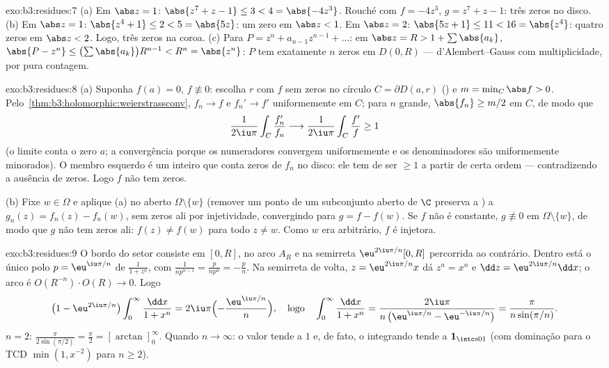 \begin{solution}{exo:b3:residues:7}
(a) Em $\abs z = 1$: $\abs{z^7 + z - 1} \leq 3 < 4 =
\abs{-4z^3}$. Rouché com $f = -4z^3$, $g = z^7 + z - 1$:
três zeros no disco.
(b) Em $\abs z = 1$: $\abs{z^4 + 1} \leq 2 < 5 = \abs{5z}$:
um zero em $\abs z < 1$. Em $\abs z = 2$: $\abs{5z + 1} \leq
11 < 16 = \abs{z^4}$: quatro zeros em $\abs z < 2$. Logo, três
zeros na coroa.
(c) Para $P = z^n + a_{n-1}z^{n-1} + \dots$: em $\abs z = R >
1 + \sum\abs{a_k}$, $\abs{P - z^n} \leq
\bigl(\sum\abs{a_k}\bigr)R^{n-1} < R^n = \abs{z^n}$: $P$ tem
exatamente $n$ zeros em $D(0, R)$ --- d'Alembert--Gauss com
multiplicidade, por pura contagem.
\end{solution}

\begin{solution}{exo:b3:residues:8}
(a) Suponha $f(a) = 0$, $f \not\equiv 0$: escolha $r$ com $f$
sem zeros no círculo $C = \partial D(a, r)$ () e $m = \min_C\abs f > 0$. Pelo~\cref{thm:b3:holomorphic:weierstrassconv}, $f_n \to f$ e
$f_n' \to f'$ uniformemente em $C$; para $n$ grande, $\abs{f_n}
\geq m/2$ em $C$, de modo que
\[
\frac1{2\iu\pi}\int_C\frac{f_n'}{f_n}
\longrightarrow \frac1{2\iu\pi}\int_C\frac{f'}{f} \geq 1
\]
(o limite conta o zero $a$; a convergência porque
os numeradores convergem uniformemente e os denominadores são uniformemente
minorados). O membro esquerdo é um inteiro que conta zeros de
$f_n$ no disco: ele tem de ser $\geq 1$ a partir de certa ordem ---
contradizendo a ausência de zeros. Logo $f$ não tem zeros.

(b) Fixe $w \in \Omega$ e aplique (a) no aberto 
$\Omega\setminus\{w\}$ (remover um ponto de um subconjunto aberto
 de $\C$ preserva a ) a $g_n(z) = f_n(z) -
f_n(w)$, sem zeros ali por injetividade, convergindo para $g = f
- f(w)$. Se $f$ não é constante, $g \not\equiv 0$ em
$\Omega\setminus\{w\}$, de modo que $g$ não tem zeros ali: $f(z) \neq
f(w)$ para todo $z \neq w$. Como $w$ era arbitrário, $f$ é
injetora.
\end{solution}

\begin{solution}{exo:b3:residues:9}
O bordo do setor consiste em $[0, R]$, no arco $A_R$ e na
semirreta $\eu^{2\iu\pi/n}[0, R]$ percorrida ao contrário. Dentro está o
único polo $p = \eu^{\iu\pi/n}$ de $\frac1{1+z^n}$, com
 $\frac1{np^{n-1}} = \frac{p}{np^n} = -\frac pn$. Na
semirreta de volta, $z = \eu^{2\iu\pi/n}x$ dá $z^n = x^n$ e
$\dd z = \eu^{2\iu\pi/n}\dd x$; o arco é
$O(R^{-n})\cdot O(R) \to 0$. Logo
\[
\bigl(1 - \eu^{2\iu\pi/n}\bigr)
\int_0^\infty\frac{\dd x}{1 + x^n}
= 2\iu\pi\Bigl(-\frac{\eu^{\iu\pi/n}}n\Bigr),
\quad\text{logo}\quad
\int_0^\infty\frac{\dd x}{1+x^n}
= \frac{2\iu\pi}{n\,\bigl(\eu^{\iu\pi/n} -
\eu^{-\iu\pi/n}\bigr)} = \frac{\pi}{n\sin(\pi/n)} .
\]
$n = 2$: $\frac\pi{2\sin(\pi/2)} = \frac\pi2 =
[\arctan]_0^\infty$. Quando $n \to \infty$: o valor tende a
$1$ e, de fato, o integrando tende a $\mathbf 1_{\intco01}$
(com dominação para o TCD $\min(1, x^{-2})$ para $n \geq 2$).
\end{solution}

